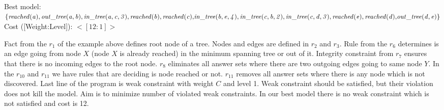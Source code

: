 \documentclass[14pt,a4paper, titlepage]{article}
\begin{document}
Best model: $\mathit{\{reached(a), out\_tree(a,b), in\_tree(a,c,3), reached(b), reached(c),}\\ \mathit{ in\_tree(b,e,4), in\_tree(c,b,2), in\_tree(c,d,3), reached(e), reached(d),} \\ \mathit{  out\_tree(d,e)\}}$
\\Cost ([Weight:Level]): $<[12:1]>$

Fact from the $r_1$ of the example above defines root node of a tree. Nodes and edges are defined in $r_2$ and $r_3$. Rule from the $r_6$ determines is an edge going from node $X$ (node $X$ is already reached) in the minimum spanning tree or out of it. Integrity constraint from $r_7$ ensures that there is no incoming edges to the root node. $r_8$ eliminates all answer sets where there are two outgoing edges going to same node $Y$. In the $r_{10}$ and $r_{11}$ we have rules that are deciding is node reached or not. $r_{11}$ removes all answer sets where there is any node which is not discovered. Last line of the program is weak constraint with weight $C$ and level 1. Weak constraint should be satisfied, but their violation does not kill the model. Aim is to minimize number of violated weak constraints. In our best model there is no weak constraint which is not satisfied and cost is 12.  
\end{document}
